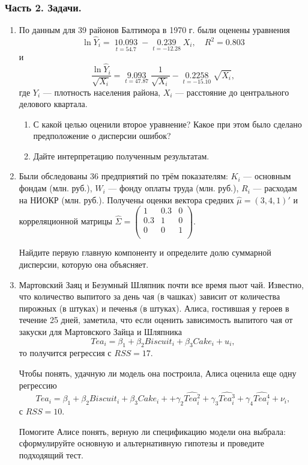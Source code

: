 \documentclass[12pt, a4paper]{article}
\theoremstyle{definition}
\begin{document}
\subsubsection*{Часть 2. Задачи.}


\begin{enumerate}

\item По данным для 39 районов Балтимора в 1970 г. были оценены уравнения
\[\ln {\hat Y_i} = \mathop {10.093}\limits_{t = 54.7}  - \mathop {0.239}\limits_{t =  - 12.28} {X_i},\quad {R^2} = 0.803\]
и
\[\frac{{\ln {{\hat Y}_i}}}{{\sqrt {{X_i}} }} = \mathop {9.093}\limits_{t = 47.87} \frac{1}{{\sqrt {{X_i}} }} - \mathop {0.2258}\limits_{t =  - 15.10} \sqrt {{X_i}} ,\]
где $Y_i$ — плотность населения района, $X_i$ — расстояние до центрального делового квартала.

\begin{enumerate}
\item С какой целью оценили второе уравнение? Какое при этом было сделано предположение о дисперсии ошибок?
\item Дайте интерпретацию полученным результатам.
\end{enumerate}

\item Были обследованы 36 предприятий по трём показателям:  $K_i$ — основным фондам (млн. руб.), $W_i$ — фонду оплаты труда (млн. руб.), 
$R_i$ — расходам на НИОКР (млн. руб.). 
Получены оценки вектора средних $\hat \mu = (3, 4, 1)'$ и корреляционной матрицы  $\hat\Sigma = \begin{pmatrix}
1 & 0.3 & 0 \\
0.3 & 1 & 0 \\
0 & 0 & 1 \\
\end{pmatrix}
$.

Найдите первую главную компоненту и определите долю суммарной дисперсии, которую она объясняет.

\item Мартовский Заяц и Безумный Шляпник почти все время пьют чай. 
Известно, что количество выпитого за день чая (в чашках) зависит от количества пирожных (в штуках) и печенья (в штуках). Алиса, гостившая у героев в течение 25 дней, заметила, что если оценить зависимость выпитого чая от закуски для Мартовского Зайца и Шляпника
\[
Tea_i = \beta_1 + \beta_2 Biscuit_i + \beta_3 Cake_i + u_i,
\]
то получится регрессия с $RSS = 17$.

Чтобы понять, удачную ли модель она построила, Алиса оценила еще одну регрессию
\[
Tea_i = \beta_1 + \beta_2 Biscuit_i + \beta_3 Cake_i +
   +\gamma_2 \widehat{Tea_i^2} +\gamma_3 \widehat{Tea_i^3} +\gamma_4 \widehat{Tea_i^4} + \nu_i,
\]
с $RSS = 10$.

Помогите Алисе понять, верную ли спецификацию модели она выбрала: сформулируйте основную и альтернативную гипотезы и проведите подходящий тест.



\end{enumerate}
\end{document}
